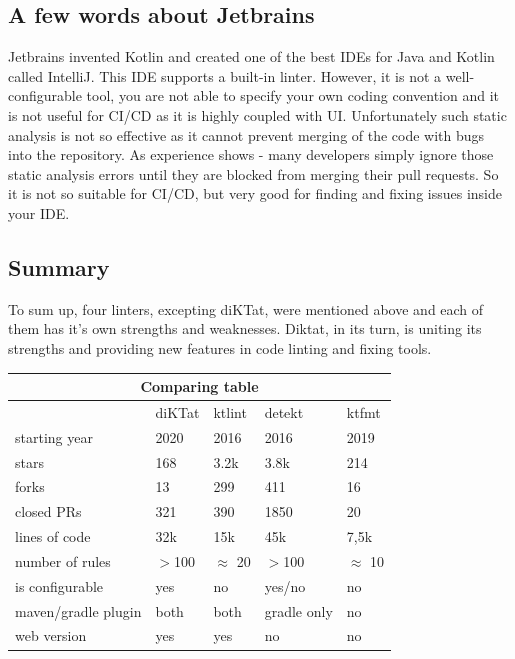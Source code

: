 \subsection{A few words about Jetbrains}
Jetbrains invented  Kotlin and created one of the best IDEs for Java and Kotlin called IntelliJ. This IDE supports a built-in linter. However, it is not a well-configurable tool, you are not able to specify your own coding convention and it is not useful for CI/CD as it is highly coupled with UI. Unfortunately such static analysis is not so effective as it cannot prevent merging of the code with bugs into the repository. As experience shows - many developers simply ignore those static analysis errors until they are blocked from merging their pull requests. So it is not so suitable for CI/CD, but very good for finding and fixing issues inside your IDE.

\subsection{Summary}
To sum up, four linters, excepting diKTat, were mentioned above and each of them has it's own strengths and weaknesses. Diktat, in its turn, is uniting its strengths and providing new features in code linting and fixing tools.
\begin{center}
\begin{tabular}{ |p{3cm}|p{2.5cm}|p{2.5cm}|p{2.5cm}|p{2.5cm}| }
\hline
\multicolumn{5}{|c|}{\textbf{Comparing table}} \\
\hline
& diKTat& ktlint &detekt & ktfmt \\
\hline
starting year & 2020 & 2016 & 2016 & 2019 \\
stars & 168 & 3.2k & 3.8k & 214\\ 
forks & 13 & 299 & 411 & 16\\
closed PRs & 321 & 390 & 1850 & 20 \\
lines of code & 32k & 15k & 45k & 7,5k\\
number of rules & $>$100 & $\approx$ 20 & $>$100 & $\approx$ 10 \\
is configurable & yes & no & yes/no & no \\
maven/gradle plugin & both & both & gradle only & no \\
web version & yes & yes & no & no \\
\hline

\hline
\end{tabular}
\end{center}